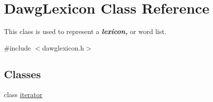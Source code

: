 \hypertarget{classDawgLexicon}{}\section{Dawg\+Lexicon Class Reference}
\label{classDawgLexicon}


This class is used to represent a {\bfseries {\itshape lexicon,}} or word list.  




{\ttfamily \#include $<$dawglexicon.\+h$>$}

\subsection*{Classes}
\begin{DoxyCompactItemize}
\item 
class \mbox{\hyperlink{classDawgLexicon_1_1iterator}{iterator}}
\end{DoxyCompactItemize}
